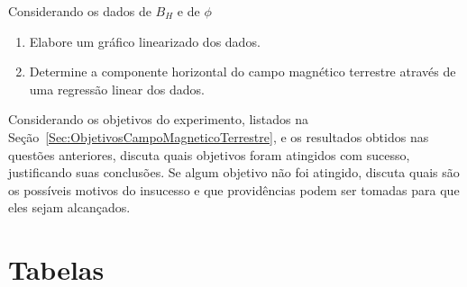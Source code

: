 \begin{question}[type={exam}]{4}
Considerando os dados de $B_H$ e de $\phi$
\begin{enumerate}[label=\roman*.]
    \item Elabore um gráfico linearizado dos dados.
    \item Determine a componente horizontal do campo magnético terrestre através de uma regressão linear dos dados. 
\end{enumerate}
\end{question}

\begin{question}[type={exam}]{2}
Considerando os objetivos do experimento, listados na Seção~\ref{Sec:ObjetivosCampoMagneticoTerrestre}, e os resultados obtidos nas questões anteriores, discuta quais objetivos foram atingidos com sucesso, justificando suas conclusões. Se algum objetivo não foi atingido, discuta quais são os possíveis motivos do insucesso e que providências podem ser tomadas para que eles sejam alcançados.
\end{question}

\vfill
\pagebreak
\section{Tabelas}

